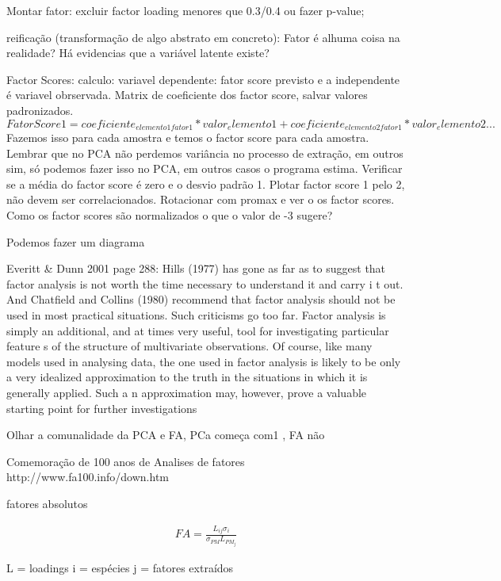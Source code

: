 Montar fator: excluir factor loading menores que 0.3/0.4 ou fazer p-value;  

reificação (transformação de algo abstrato em concreto): Fator é alhuma coisa na realidade? Há evidencias que a variável latente existe?

Factor Scores: calculo: variavel dependente: fator score previsto e a independente é variavel obrservada. Matrix de coeficiente dos factor score, salvar valores padronizados.
\begin{equation}
FatorScore1 = coeficiente_{elemento1 fator1}*valor_elemento1 + coeficiente_{elemento2 fator1}*valor_elemento2 ...
\end{equation} 
Fazemos isso para cada amostra e temos o factor score para cada amostra. Lembrar que no PCA não perdemos variância no processo de extração, em outros sim, só podemos fazer isso no PCA, em outros casos o programa estima. Verificar se a média do factor score é zero e o desvio padrão 1. Plotar factor score 1 pelo 2, não devem ser correlacionados. Rotacionar com promax e ver o os factor scores. Como os factor scores são normalizados o que o valor de -3 sugere?

Podemos fazer um diagrama

Everitt \& Dunn 2001 page 288:
Hills (1977) has gone as far as to suggest that factor analysis is not worth the time necessary to understand it and carry i
t out. And
Chatfield and Collins (1980) recommend that factor analysis should not be used in most practical situations. Such criticisms
go too far.
Factor analysis is simply an additional, and at times very useful, tool for investigating particular feature
s of the structure of multivariate
observations. Of course, like many models used in analysing data, the one used in factor analysis is likely to be only a very
idealized
approximation to the truth in the situations in which it is generally applied. Such a
n approximation may, however, prove a valuable starting
point for further investigations

Olhar a comunalidade da PCA e FA, PCa começa com1 , FA não

Comemoração de 100 anos de Analises de fatores http://www.fa100.info/down.htm

fatores absolutos

\begin{eqnarray}
FA = \frac{L_{ij}\sigma_i}{\sigma_{PM}L_{PM_j}}
\end{eqnarray}

L = loadings
i = espécies
j = fatores extraídos

